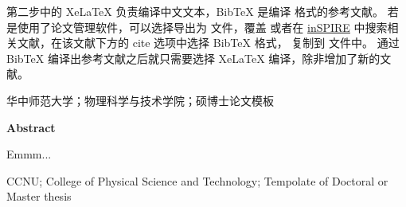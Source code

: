 第二步中的 XeLaTeX 负责编译中文文本，BibTeX 是编译 \verb!! 格式的参考文献。
若是使用了论文管理软件，可以选择导出为 \verb!! 文件，覆盖 \verb!!
或者在 \href{}{inSPIRE} 中搜索相关文献，在该文献下方的 cite 选项中选择 BibTeX 格式，
复制到 \verb!! 文件中。
通过 BibTeX 编译出参考文献之后就只需要选择 XeLaTeX 编译，除非增加了新的文献。

\vspace{1cm} 华中师范大学；物理科学与技术学院；硕博士论文模板



\newpage %
\headsep=0.7cm
\centerline{\bf \sanhao Abstract}
\label{abs}
\vspace{0.5cm}

Emmm...

\vspace{1cm} CCNU; College of Physical Science and Technology; Tempolate of Doctoral or Master thesis